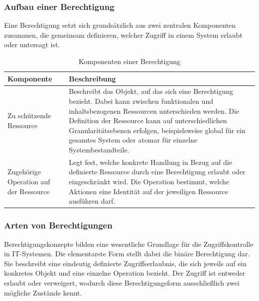 \subsubsection{Aufbau einer Berechtigung}

Eine Berechtigung setzt sich grundsätzlich aus zwei zentralen Komponenten zusammen,
die gemeinsam definieren, welcher Zugriff in einem System erlaubt oder untersagt ist.

\begin{table}[H]
    \centering
    \caption{Komponenten einer Berechtigung \cite{tsolkas2017rollen}}
    \label{tab:aufbau-berechtigung}
    \begin{tabular}{p{4cm} p{10cm}}
        \textbf{Komponente} & \textbf{Beschreibung} \\ \hline

        Zu schützende Ressource &
        Beschreibt das Objekt, auf das sich eine Berechtigung bezieht.
        Dabei kann zwischen funktionalen und inhaltsbezogenen Ressourcen
        unterschieden werden.
        Die Definition der Ressource kann auf unterschiedlichen
        Granularitätsebenen erfolgen, beispielsweise global für ein gesamtes System
        oder atomar für einzelne Systembestandteile. \\ \hline

        Zugehörige Operation auf der Ressource &
        Legt fest, welche konkrete Handlung in Bezug auf die definierte Ressource
        durch eine Berechtigung erlaubt oder eingeschränkt wird.
        Die Operation bestimmt, welche Aktionen eine Identität auf der jeweiligen
        Ressource ausführen darf. \\ \hline
    \end{tabular}
\end{table}

\subsubsection{Arten von Berechtigungen}

Berechtigungskonzepte bilden eine wesentliche Grundlage für die Zugriffskontrolle
in IT-Systemen. Die elementarste Form stellt dabei die binäre Berechtigung
dar. Sie beschreibt eine eindeutig definierte Zugriffserlaubnis, die sich jeweils auf
ein konkretes Objekt und eine einzelne Operation bezieht. Der Zugriff ist entweder
erlaubt oder verweigert, wodurch diese Berechtigungsform ausschließlich zwei mögliche
Zustände kennt. \cite{tsolkas2017rollen}

